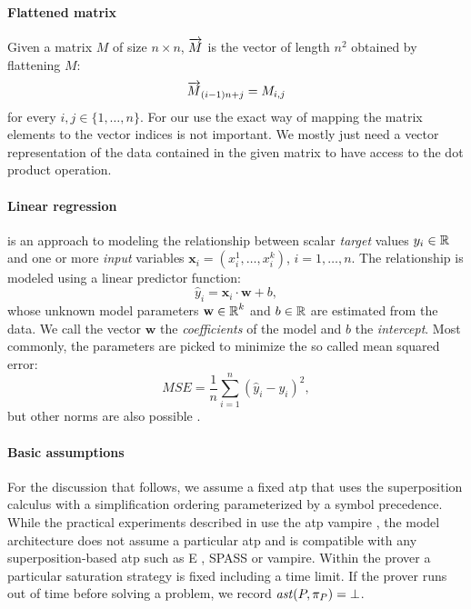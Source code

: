 \paragraph{Flattened matrix}
Given a matrix \(M\) of size \(n \times n\),
\(\overrightarrow{M}\) is the vector of length \(n^2\) obtained by flattening \(M\):
\begin{align*}
\overrightarrow{M}_{(i - 1) n + j} = M_{i, j}
\end{align*}
for every \(i,j\in\{1,\ldots,n\}\). For our use the exact way of mapping the 
matrix elements to the vector indices is not important. We mostly just need a vector representation
of the data contained in the given matrix to have access to the dot product operation. %

\paragraph{Linear regression}
is an approach to modeling the relationship between scalar \emph{target} values $y_i \in \operatorname{\mathbb{R}}$
and one or more \emph{input} variables $\mathbf{x}_i = (x^1_i,\ldots,x^k_i)$, $i = 1,\ldots,n$.
The relationship is modeled using a linear predictor function:
\[\hat{y}_i =  \mathbf{x}_i \cdot \mathbf{w} + b, \]
whose unknown model parameters $\mathbf{w}\in \operatorname{\mathbb{R}}^k$ and $b \in \operatorname{\mathbb{R}}$ are estimated from the data.
We call the vector $\mathbf{w}$ the \emph{coefficients} of the model and $b$ the \emph{intercept}.
Most commonly, the parameters are picked to minimize the so called mean squared error:
\[\mathit{MSE} = \frac{1}{n} \sum\limits_{i=1}^n (\hat{y}_i - y_i)^2, \]
but other norms are also possible \cite{hastie01statisticallearning}.


\paragraph{Basic assumptions}

For the discussion that follows,
we assume a fixed %
\gls*{atp} that uses the superposition calculus with a simplification ordering parameterized by a symbol precedence.
While the practical experiments described in  use the \gls*{atp} \gls*{vampire} \cite{Kovacs2013},
the model architecture does not assume a particular \gls*{atp}
and is compatible with any superposition-based \gls*{atp} such as E \cite{SCV:CADE-2019}, SPASS \cite{DBLP:conf/cade/WeidenbachDFKSW09} or  \gls*{vampire}.
% 
Within the prover a particular saturation strategy is fixed including a time limit.
If the prover runs out of time before solving a problem, we record \(\operatorname{\mathit{ast}}(P,\pi_P) = \bot\).

